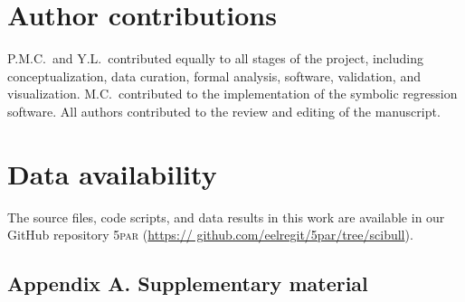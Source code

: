 \documentclass[12pt]{article}
\begin{document}
\section*{Author contributions}
P.M.C.\ and Y.L.\ contributed equally to all stages of the project,
including conceptualization, data curation, formal analysis, software,
validation, and visualization.
M.C.\ contributed to the implementation of the symbolic regression
software.
All authors contributed to the review and editing of the manuscript.


\section*{Data availability}
The source files, code scripts, and data results in this work are
available in our GitHub repository \textsc{5par} (\url{https:// github.com/eelregit/5par/tree/scibull}).

\subsection*{Appendix A. Supplementary material}
 








\end{document}
